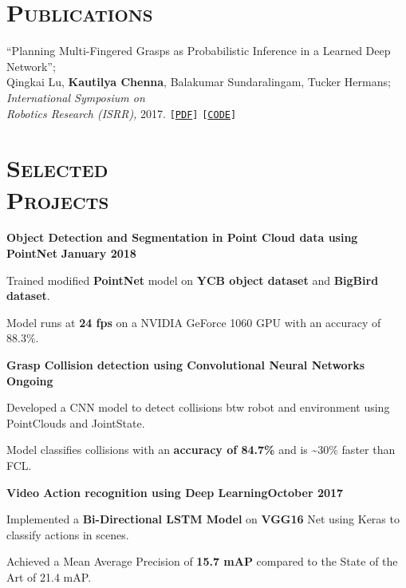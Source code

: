 \documentclass[margin, line]{resume}
\begin{document}
\begin{resume}

    \sectionline
    \section{\mysidestyle \textsc{Publications}}
     ``Planning Multi-Fingered Grasps as Probabilistic Inference in a Learned Deep Network''; \\Qingkai Lu,
     {\bf Kautilya Chenna}, Balakumar Sundaralingam, Tucker Hermans; \textit{International Symposium on\\ Robotics Research (ISRR),} 2017. \texttt{[\href{http://www.cs.utah.edu/~thermans/papers/lu-isrr2017-deep-multifinger-grasping.pdf}{PDF}]} \texttt{[\href{https://robot-learning.cs.utah.edu/project/grasp\_inference}{CODE}]}%



    \sectionline
    \section{\mysidestyle \textsc{Selected \\ Projects}}

    \textbf{Object Detection and Segmentation in Point Cloud data using PointNet} \hfill \textbf{January 2018}
    \begin{list2}
        \item Trained modified \textbf{PointNet} model on \textbf{YCB object dataset} and \textbf{BigBird dataset}.
        \item Model runs at \textbf{24 fps} on a NVIDIA GeForce 1060 GPU with an accuracy of 88.3\%.
    \end{list2}\vspace{-3.2mm}

    \textbf{Grasp Collision detection using Convolutional Neural Networks} \hfill \textbf{Ongoing}
    \begin{list2}
        \item Developed a CNN model to detect collisions btw robot and environment using PointClouds and JointState.
        \item Model classifies collisions with an \textbf{accuracy of 84.7\%} and is \textasciitilde 30\% faster than FCL.
    \end{list2}\vspace{-3.2mm}

    \textbf{Video Action recognition using Deep Learning}\hfill \textbf{October 2017}
    \begin{list2}
    \item Implemented a \textbf{Bi-Directional LSTM Model} on \textbf{VGG16} Net using Keras to classify actions in scenes.
    \item Achieved a Mean Average Precision of \textbf{15.7 mAP} compared to the State of the Art of 21.4 mAP.
    \end{list2}\vspace{-3.2mm}


\end{resume}
\end{document}
